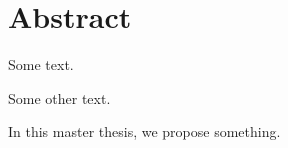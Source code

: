 \chapter*{Abstract}
\thispagestyle{empty}

\vspace{-3cm}
\vfill

\begin{center}
\begin{minipage}{15cm}
Some text.
\newline

Some other text.
\newline

In this master thesis, we propose something.
\end{minipage}
\end{center}

\vfill
